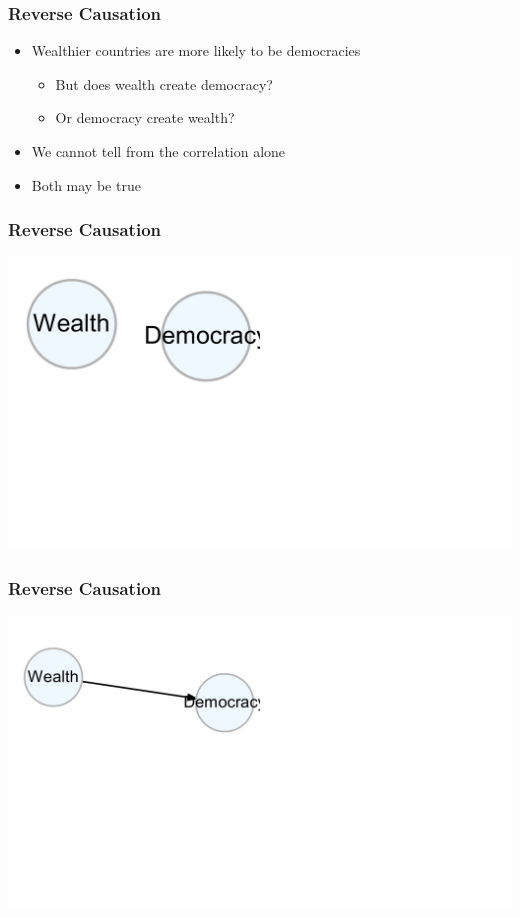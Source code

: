 \documentclass[xcolor=x11names,compress]{beamer}\usepackage[]{graphicx}\usepackage[]{color}
\makeatletter
\def\maxwidth{ %
  \ifdim\Gin@nat@width>\linewidth
    \linewidth
  \else
    \Gin@nat@width
  \fi
}
\newenvironment{knitrout}{}{} %
\renewcommand{\(}{\begin{columns}}
\renewcommand{\)}{\end{columns}}
\newcommand{\<}[1]{\begin{column}{#1}}
\renewcommand{\>}{\end{column}}
\makeatother
\begin{document}
\begin{frame}
\frametitle{Reverse Causation}
\begin{itemize}
\item Wealthier countries are more likely to be democracies
\begin{itemize}
\item But does wealth create democracy?
\item Or democracy create wealth?
\end{itemize}
\item We cannot tell from the correlation alone
\item Both may be true
\end{itemize}
\end{frame}

\begin{frame}
\frametitle{Reverse Causation}
\begin{knitrout}
\color{fgcolor}
\includegraphics[width=\maxwidth]{figure/unnamed-chunk-5-1} 

\end{knitrout}
\end{frame}

\begin{frame}
\frametitle{Reverse Causation}
\begin{knitrout}
\color{fgcolor}
\includegraphics[width=\maxwidth]{figure/unnamed-chunk-6-1} 

\end{knitrout}
\end{frame}
\end{document}
